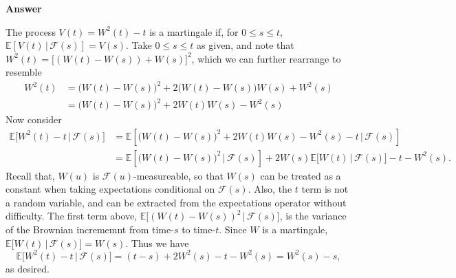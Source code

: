 \documentclass[11pt]{article}
\newcommand\E{\mathbb{E}}
\newcommand\cF{\mathcal{F}}
\newenvironment{hwanswer}
    {
        \vspace{2mm}
        {\bfseries Answer}
        \vspace{-\abovedisplayskip}
        \begin{center}
            \begin{tcolorbox}[
                width=0.95\textwidth,
                colback=white,
                colframe=white,
                opacityback=0,
                opacityframe=0,
                boxrule=0pt,
                frame hidden,
                breakable,
                before upper={\parindent15pt} %
            ]
            \lineskip=0pt %
    }
    {
        \end{tcolorbox}
        \end{center}
        \vspace{4mm}
    }
\begin{document}
    \begin{hwanswer}
        The process $V(t) = W^2(t) - t$ is a martingale if, for $0 \leq s \leq t$,
        $\E[V(t) \, | \, \cF(s)] = V(s)$. Take $0 \leq s \leq t$ as given, and note that
        $W^2(t) = \big[ (W(t) - W(s)) + W(s) \big]^2$, which we can further rearrange to
        resemble
        \[
            \begin{aligned}
                W^2(t)
                &=
                \big( W(t) - W(s) \big)^2 + 2\big(W(t) - W(s)\big) W(s) + W^2(s)
                \\
                &=
                \big( W(t) - W(s) \big)^2 + 2W(t)W(s) - W^2(s)
            \end{aligned}
        \]
        Now consider
        \[
            \begin{aligned}
                \E\big[ W^2(t) - t \, | \, \cF(s) \big]
                &=
                \E\left[
                    \big( W(t) - W(s) \big)^2 + 2W(t)W(s) - W^2(s) - t
                    \, | \,
                    \cF(s)
                \right]
                \\
                &=
                \E\left[
                    \big( W(t) - W(s) \big)^2
                    \, | \,
                    \cF(s)
                \right]
                +
                2 W(s) \E \big[ W(t) \, | \, \cF(s) \big]
                -
                t
                -
                W^2(s).
            \end{aligned}
        \]
        Recall that, $W(u)$ is $\cF(u)$-measureable, so that $W(s)$ can be treated as a
        constant when taking expectations conditional on $\cF(s)$. Also, the $t$ term is
        not a random variable, and can be extracted from the expectations operator without
        difficulty. The first term above, $\E\big[ (W(t) - W(s))^2 \, | \, \cF(s) \big]$, is
        the variance of the Brownian incrememnt from time-$s$ to time-$t$. Since $W$ is a
        martingale, $\E\big[W(t) \, | \, \cF(s)\big] = W(s)$. Thus we have
        \[
            \E\big[ W^2(t) - t \, | \, \cF(s) \big]
            =
            (t - s)
            +
            2 W^2(s) - t - W^2(s)
            =
            W^2(s) - s,
        \]
        as desired.
    \end{hwanswer}
\end{document}
